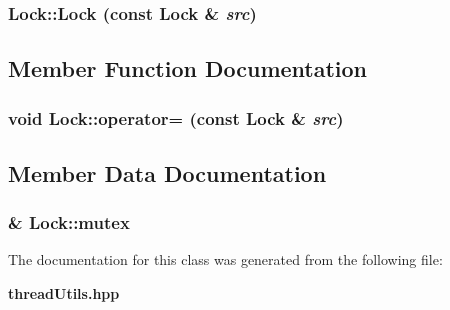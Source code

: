 \subsubsection{\setlength{\rightskip}{0pt plus 5cm}Lock::Lock (const {\bf Lock} \& {\em src})\hspace{0.3cm}{\tt  [private]}}\label{classLock_5aba40fb170cf8fbfbe241ecac4b66b2}




\subsection{Member Function Documentation}
\subsubsection{\setlength{\rightskip}{0pt plus 5cm}void Lock::operator= (const {\bf Lock} \& {\em src})\hspace{0.3cm}{\tt  [private]}}\label{classLock_6beb534a89b213d70e4b3bb9b3cde217}




\subsection{Member Data Documentation}
\subsubsection{\& {\bf Lock::mutex}\hspace{0.3cm}{\tt  [private]}}\label{classLock_41f8817641e260bddb93a7a710736037}




The documentation for this class was generated from the following file:\begin{CompactItemize}
\item 
{\bf thread\-Utils.hpp}\end{CompactItemize}
